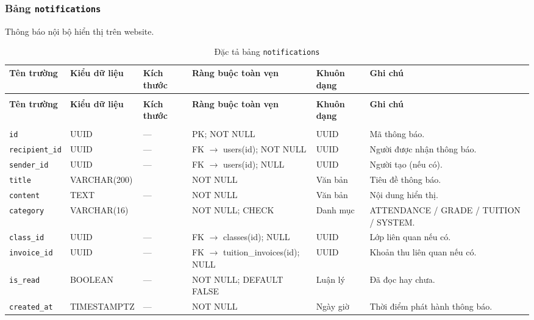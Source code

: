 \subsubsection{Bảng \texttt{notifications}}
Thông báo nội bộ hiển thị trên website.

\begingroup
\fontsize{9.2}{11.2}\selectfont
\setlength{\tabcolsep}{2.4pt}
\renewcommand{\arraystretch}{1.22}
\begin{longtable}{|>{\raggedright\arraybackslash}p{2.25cm}|>{\raggedright\arraybackslash}p{2.48cm}|>{\raggedright\arraybackslash}p{0.95cm}|>{\raggedright\arraybackslash}p{3.0cm}|>{\raggedright\arraybackslash}p{1.25cm}|>{\raggedright\arraybackslash}p{4.27cm}|}
\caption{Đặc tả bảng \texttt{notifications}}\label{tab:csdl:notifications}\\
\hline\rowcolor{blue!11}\textbf{Tên trường}&\textbf{Kiểu dữ liệu}&\textbf{Kích thước}&\textbf{Ràng buộc toàn vẹn}&\textbf{Khuôn dạng}&\textbf{Ghi chú}\\\hline
\endfirsthead
\multicolumn{6}{r}{\textit{Tiếp bảng \texttt{notifications}}}\\
\hline\rowcolor{blue!11}\textbf{Tên trường}&\textbf{Kiểu dữ liệu}&\textbf{Kích thước}&\textbf{Ràng buộc toàn vẹn}&\textbf{Khuôn dạng}&\textbf{Ghi chú}\\\hline
\endhead
\hline\multicolumn{6}{r}{\footnotesize\textit{Còn tiếp trang sau}}\\
\endfoot
\hline
\endlastfoot
\texttt{id} & UUID & — & PK; NOT NULL & UUID & Mã thông báo.\\\hline
\rowcolor{gray!5}
\texttt{recipient\_\allowbreak{}id} & UUID & — & FK $\rightarrow$ users(id); NOT NULL & UUID & Người được nhận thông báo.\\\hline
\texttt{sender\_\allowbreak{}id} & UUID & — & FK $\rightarrow$ users(id); NULL & UUID & Người tạo (nếu có).\\\hline
\rowcolor{gray!5}
\texttt{title} & VARCHAR(200) & 200 & NOT NULL & Văn bản & Tiêu đề thông báo.\\\hline
\texttt{content} & TEXT & — & NOT NULL & Văn bản & Nội dung hiển thị.\\\hline
\rowcolor{gray!5}
\texttt{category} & VARCHAR(16) & 16 & NOT NULL; CHECK & Danh mục & ATTENDANCE / GRADE / TUITION / SYSTEM.\\\hline
\texttt{class\_\allowbreak{}id} & UUID & — & FK $\rightarrow$ classes(id); NULL & UUID & Lớp liên quan nếu có.\\\hline
\rowcolor{gray!5}
\texttt{invoice\_\allowbreak{}id} & UUID & — & FK $\rightarrow$ tuition\_\allowbreak{}invoices(id); NULL & UUID & Khoản thu liên quan nếu có.\\\hline
\texttt{is\_\allowbreak{}read} & BOOLEAN & — & NOT NULL; DEFAULT FALSE & Luận lý & Đã đọc hay chưa.\\\hline
\rowcolor{gray!5}
\texttt{created\_\allowbreak{}at} & TIMESTAMPTZ & — & NOT NULL & Ngày giờ & Thời điểm phát hành thông báo.\\\hline
\end{longtable}
\endgroup

